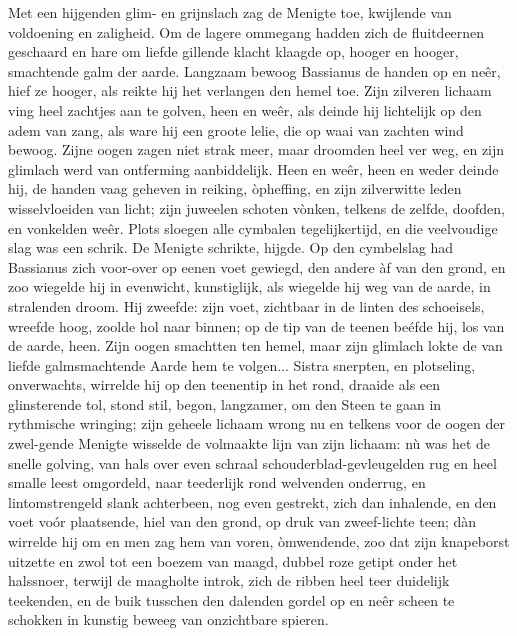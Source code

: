 \documentclass[a4paper, 12pt, oneside, dutch]{article}
\begin{document}
Met een hijgenden glim- en grijnslach zag de Menigte toe, kwijlende van voldoening en zaligheid. Om de lagere ommegang hadden zich de fluitdeernen geschaard en hare om liefde gillende klacht klaagde op, hooger en hooger, smachtende galm der aarde. Langzaam bewoog Bassianus de handen op en neêr, hief ze hooger, als reikte hij het verlangen den hemel toe. Zijn zilveren lichaam ving heel zachtjes aan te golven, heen en weêr, als deinde hij lichtelijk op den adem van zang, als ware hij een groote lelie, die op waai van zachten wind bewoog. Zijne oogen zagen niet strak meer, maar droomden heel ver weg, en zijn glimlach werd van ontferming aanbiddelijk. Heen en weêr, heen en weder deinde hij, de handen vaag geheven in reiking, òpheffing, en zijn zilverwitte leden wisselvloeiden van licht; zijn juweelen schoten vònken, telkens de zelfde, doofden, en vonkelden weêr. Plots sloegen alle cymbalen tegelijkertijd, en die veelvoudige slag was een schrik. De Menigte schrikte, hijgde. Op den cymbelslag had Bassianus zich voor-over op eenen voet gewiegd, den andere àf van den grond, en zoo wiegelde hij in evenwicht, kunstiglijk, als wiegelde hij weg van de aarde, in stralenden droom. Hij zweefde: zijn voet, zichtbaar in de linten des schoeisels, wreefde hoog, zoolde hol naar binnen; op de tip van de teenen beéfde hij, los van de aarde, heen. Zijn oogen smachtten ten hemel, maar zijn glimlach lokte de van liefde galmsmachtende Aarde hem te volgen... Sistra snerpten, en plotseling, onverwachts, wirrelde hij op den teenentip in het rond, draaide als een glinsterende tol, stond stil, begon, langzamer, om den Steen te gaan in rythmische wringing; zijn geheele lichaam wrong nu en telkens voor de oogen der zwel-gende Menigte wisselde de volmaakte lijn van zijn lichaam: nù was het de snelle golving, van hals over even schraal schouderblad-gevleugelden rug en heel smalle leest omgordeld, naar teederlijk rond welvenden onderrug, en lintomstrengeld slank achterbeen, nog even gestrekt, zich dan inhalende, en den voet voór plaatsende, hiel van den grond, op druk van zweef-lichte teen; dàn wirrelde hij om en men zag hem van voren, òmwendende, zoo dat zijn knapeborst uitzette en zwol tot een boezem van maagd, dubbel roze getipt onder het halssnoer, terwijl de maagholte introk, zich de ribben heel teer duidelijk teekenden, en de buik tusschen den dalenden gordel op en neêr scheen te schokken in kunstig beweeg van onzichtbare spieren.
\end{document}

